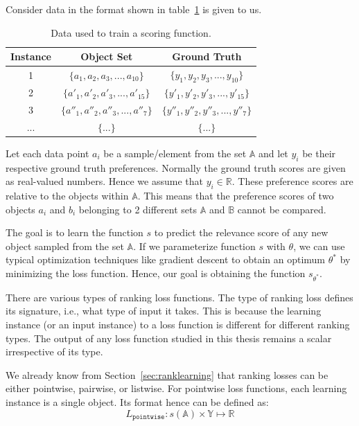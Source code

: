 \documentclass[12pt, twoside, ngerman]{report}
\begin{document}
Consider data in the format shown in table~\ref{tab:dataformat} is given to us.

\begin{table} [ht]
\centering
\begin{tabular}{ | c | c | c | }
  \toprule
  Instance & Object Set & Ground Truth \\ \midrule
  1 & $\{a_1, a_2, a_3, ... , a_{10}\}$  & $\{y_1, y_2, y_3, ... , y_{10}\}$  \\
  2 & $\{a'_1, a'_2, a'_3, ... , a'_{15}\}$ & $\{y'_1, y'_2, y'_3, ... , y'_{15}\}$  \\
  3 & $\{a''_1, a''_2, a''_3, ... , a''_{7}\}$ & $\{y''_1, y''_2, y''_3, ... , y''_{7}\}$  \\
  ... & $\{...\}$ & $\{...\}$ \\
  \bottomrule
\end{tabular}
\caption{Data used to train a scoring function.}
\label {tab:dataformat}
\end{table}

Let each data point $a_i$ be a sample/element from the set $\mathbb{A}$ and let $y_i$ be their respective ground truth preferences.
Normally the ground truth scores are given as real-valued numbers. Hence we assume that $y_i \in \mathbb{R}$.
These preference scores are relative to the objects within $\mathbb{A}$.
This means that the preference scores of two objects $a_i$ and $b_i$ belonging to 2 different sets $\mathbb{A}$ and $\mathbb{B}$ cannot be compared.

The goal is to learn the function $s$ to predict the relevance score of any new object sampled from the set $\mathbb{A}$.
If we parameterize function $s$ with $\theta$, we can use typical optimization techniques like gradient descent to obtain an optimum $\theta^*$ by minimizing the loss function. 
Hence, our goal is obtaining the function $s_{\theta^*}$.

There are various types of ranking loss functions. The type of ranking loss defines its signature, i.e., what type of input it takes.
This is because the learning instance (or an input instance) to a loss function is different for different ranking types.
The output of any loss function studied in this thesis remains a scalar irrespective of its type.

We already know from Section~\ref{sec:ranklearning} that ranking losses can be either pointwise, pairwise, or listwise.
For pointwise loss functions, each learning instance is a single object.
Its format hence can be defined as:
\begin{equation}
L_{\texttt{pointwise}} : s(\mathbb{A}) \times \mathbb{Y} \mapsto \mathbb{R}
\end{equation}
\end{document}
